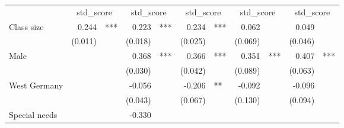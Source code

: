 \documentclass{article}
\begin{document}
\begin{table}[!h]
\centering
\begin{tabular}{lllllllllll}
\cline{1-11}
\multicolumn{1}{r}{} &
  \multicolumn{2}{c}{std\_score} &
  \multicolumn{2}{c}{std\_score} &
  \multicolumn{2}{c}{std\_score} &
  \multicolumn{2}{c}{std\_score} &
  \multicolumn{2}{c}{std\_score} \\
\cline{1-11}
\multicolumn{1}{l}{Class size} &
  \multicolumn{1}{r}{0.244} &
  \multicolumn{1}{l}{***} &
  \multicolumn{1}{r}{0.223} &
  \multicolumn{1}{l}{***} &
  \multicolumn{1}{r}{0.234} &
  \multicolumn{1}{l}{***} &
  \multicolumn{1}{r}{0.062} &
  \multicolumn{1}{l}{} &
  \multicolumn{1}{r}{0.049} &
  \multicolumn{1}{l}{} \\
\multicolumn{1}{l}{} &
  \multicolumn{1}{r}{(0.011)} &
  \multicolumn{1}{l}{} &
  \multicolumn{1}{r}{(0.018)} &
  \multicolumn{1}{l}{} &
  \multicolumn{1}{r}{(0.025)} &
  \multicolumn{1}{l}{} &
  \multicolumn{1}{r}{(0.069)} &
  \multicolumn{1}{l}{} &
  \multicolumn{1}{r}{(0.046)} &
  \multicolumn{1}{l}{} \\
\multicolumn{1}{l}{Male} &
  \multicolumn{1}{r}{} &
  \multicolumn{1}{l}{} &
  \multicolumn{1}{r}{0.368} &
  \multicolumn{1}{l}{***} &
  \multicolumn{1}{r}{0.366} &
  \multicolumn{1}{l}{***} &
  \multicolumn{1}{r}{0.351} &
  \multicolumn{1}{l}{***} &
  \multicolumn{1}{r}{0.407} &
  \multicolumn{1}{l}{***} \\
\multicolumn{1}{l}{} &
  \multicolumn{1}{r}{} &
  \multicolumn{1}{l}{} &
  \multicolumn{1}{r}{(0.030)} &
  \multicolumn{1}{l}{} &
  \multicolumn{1}{r}{(0.042)} &
  \multicolumn{1}{l}{} &
  \multicolumn{1}{r}{(0.089)} &
  \multicolumn{1}{l}{} &
  \multicolumn{1}{r}{(0.063)} &
  \multicolumn{1}{l}{} \\
\multicolumn{1}{l}{West Germany} &
  \multicolumn{1}{r}{} &
  \multicolumn{1}{l}{} &
  \multicolumn{1}{r}{-0.056} &
  \multicolumn{1}{l}{} &
  \multicolumn{1}{r}{-0.206} &
  \multicolumn{1}{l}{**} &
  \multicolumn{1}{r}{-0.092} &
  \multicolumn{1}{l}{} &
  \multicolumn{1}{r}{-0.096} &
  \multicolumn{1}{l}{} \\
\multicolumn{1}{l}{} &
  \multicolumn{1}{r}{} &
  \multicolumn{1}{l}{} &
  \multicolumn{1}{r}{(0.043)} &
  \multicolumn{1}{l}{} &
  \multicolumn{1}{r}{(0.067)} &
  \multicolumn{1}{l}{} &
  \multicolumn{1}{r}{(0.130)} &
  \multicolumn{1}{l}{} &
  \multicolumn{1}{r}{(0.094)} &
  \multicolumn{1}{l}{} \\
\multicolumn{1}{l}{Special needs} &
  \multicolumn{1}{r}{} &
  \multicolumn{1}{l}{} &
  \multicolumn{1}{r}{-0.330} &

\end{tabular}
\end{table}
\end{document}
